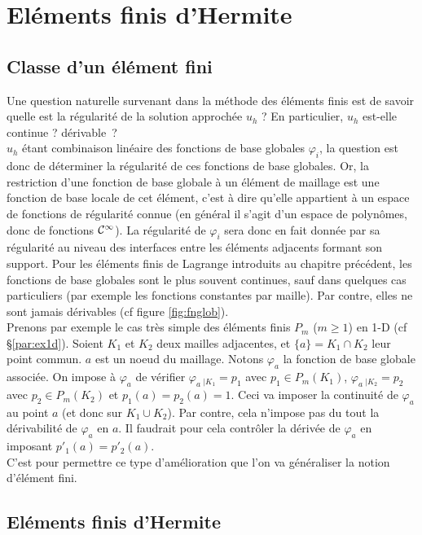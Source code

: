 \chapter{El\'ements finis d'Hermite}
%
\section{Classe d'un \'el\'ement fini}
%
\noindent
Une question naturelle survenant dans la m\'ethode des \'el\'ements finis est de savoir quelle est la r\'egularit\'e de la solution approch\'ee $u_h$ ? En particulier, $u_h$ est-elle continue ? d\'erivable~?\\
%
$u_h$ \'etant combinaison lin\'eaire des fonctions de base globales $\varphi_i$, la question est donc de d\'eterminer la r\'egularit\'e de ces fonctions de base globales. Or, la restriction d'une fonction de base globale \`a un \'el\'ement de maillage est une fonction de base locale de cet \'el\'ement, c'est \`a dire qu'elle appartient \`a un espace de fonctions de r\'egularit\'e connue (en g\'en\'eral il s'agit d'un espace de polyn\^omes, donc de fonctions ${\cal C}^\infty$). La r\'egularit\'e de $\varphi_i$ sera donc en fait donn\'ee par sa r\'egularit\'e au niveau des interfaces entre les \'el\'ements adjacents formant son support.\saut
%
Pour les \'el\'ements finis de Lagrange introduits au chapitre pr\'ec\'edent, les fonctions de base globales sont le plus souvent continues, sauf dans quelques cas particuliers (par exemple les fonctions constantes par maille). Par contre, elles ne sont jamais d\'erivables (cf figure \ref{fig:fnglob}).\\
%
Prenons par exemple le cas tr\`es simple des \'el\'ements finis $P_m$ ($m\ge
1$) en 1-D (cf \S \ref{par:ex1d}). Soient $K_1$ et $K_2$ deux mailles
adjacentes, et $\{a\}=K_1 \cap K_2$ leur point commun. $a$ est un noeud du
maillage. Notons $\varphi_a$ la fonction de base globale associ\'ee. On impose
\`a $\varphi_a$ de v\'erifier $\varphi_a\, _{|K_1} = p_1$ avec $p_1 \in
P_m(K_1)$, $\varphi_a\, _{|K_2} = p_2$ avec $p_2 \in P_m(K_2)$ et
$p_1(a)=p_2(a)=1$. Ceci va imposer la continuit\'e de $\varphi_a$ au point $a$
(et donc sur $K_1\cup K_2$). Par contre, cela n'impose pas du tout la
d\'erivabilit\'e de $\varphi_a$ en $a$. Il faudrait pour cela contr\^oler la
d\'eriv\'ee de $\varphi_a$ en imposant $p'_1(a)=p'_2(a)$.\\
% 
C'est pour permettre ce type d'am\'elioration que l'on va g\'en\'eraliser la notion
d'\'el\'ement fini. 
% 
% 
\section{El\'ements finis d'Hermite} 
%
